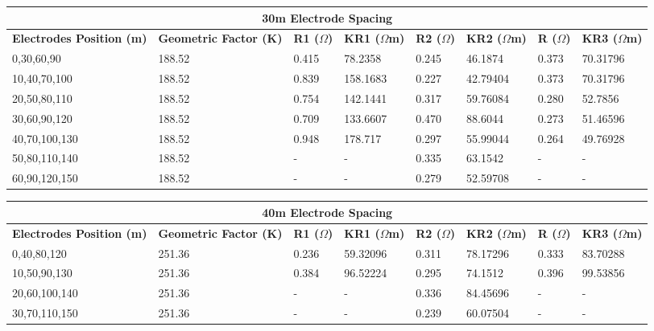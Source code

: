 \documentclass[12pt,a4paper]{report}
\begin{document}
\begin{table}[H]
    \centering
    \begin{adjustbox}{max width=\textwidth}
    \setlength{\tabcolsep}{15pt}
    \renewcommand{\arraystretch}{1.5}
    \begin{tabular}{|p{3.5cm}|p{2.5cm}|p{1.8cm}|p{2.2cm}|p{1.8cm}|p{2.2cm}|p{1.8cm}|p{2.2cm}|}
    \hline
    \multicolumn{8}{|c|}{\rule{0pt}{3em}\huge\textbf{30m Electrode Spacing}} \\ [0.5cm]
    \hline
    \textbf{Electrodes Position (m)} & \textbf{Geometric Factor (K)} & \textbf{R1 ($\Omega$)} & \textbf{KR1 ($\Omega$m)} & \textbf{R2 ($\Omega$)} & \textbf{KR2 ($\Omega$m)} & \textbf{R ($\Omega$)} & \textbf{KR3 ($\Omega$m)} \\ \hline
    0,30,60,90 & 188.52 & 0.415 & 78.2358 & 0.245 & 46.1874 & 0.373 & 70.31796 \\ \hline
    10,40,70,100 & 188.52 & 0.839 & 158.1683 & 0.227 & 42.79404 & 0.373 & 70.31796 \\ \hline
    20,50,80,110 & 188.52 & 0.754 & 142.1441 & 0.317 & 59.76084 & 0.280 & 52.7856 \\ \hline
    30,60,90,120 & 188.52 & 0.709 & 133.6607 & 0.470 & 88.6044 & 0.273 & 51.46596 \\ \hline
    40,70,100,130 & 188.52 & 0.948 & 178.717 & 0.297 & 55.99044 & 0.264 & 49.76928 \\ \hline
    50,80,110,140 & 188.52 & - & - & 0.335 & 63.1542 & - & - \\ \hline
    60,90,120,150 & 188.52 & - & - & 0.279 & 52.59708 & - & - \\ \hline
    \end{tabular}
\end{adjustbox}
\end{table}

\begin{table}[H]
    \centering
    \begin{adjustbox}{max width=\textwidth}
    \setlength{\tabcolsep}{15pt}
    \renewcommand{\arraystretch}{1.5}
    \begin{tabular}{|p{3.5cm}|p{2.5cm}|p{1.8cm}|p{2.2cm}|p{1.8cm}|p{2.2cm}|p{1.8cm}|p{2.2cm}|}
    \hline
    \multicolumn{8}{|c|}{\rule{0pt}{3em}\huge\textbf{40m Electrode Spacing}} \\ [0.5cm]
    \hline
    \textbf{Electrodes Position (m)} & \textbf{Geometric Factor (K)} & \textbf{R1 ($\Omega$)} & \textbf{KR1 ($\Omega$m)} & \textbf{R2 ($\Omega$)} & \textbf{KR2 ($\Omega$m)} & \textbf{R ($\Omega$)} & \textbf{KR3 ($\Omega$m)} \\ \hline
    0,40,80,120 & 251.36 & 0.236 & 59.32096 & 0.311 & 78.17296 & 0.333 & 83.70288 \\ \hline
10,50,90,130 & 251.36 & 0.384 & 96.52224 & 0.295 & 74.1512 & 0.396 & 99.53856 \\ \hline
20,60,100,140 & 251.36 & - & - & 0.336 & 84.45696 & - & - \\ \hline
30,70,110,150 & 251.36 & - & - & 0.239 & 60.07504 & - & - \\ \hline
    \end{tabular}
\end{adjustbox}
\end{table}
\end{document}
